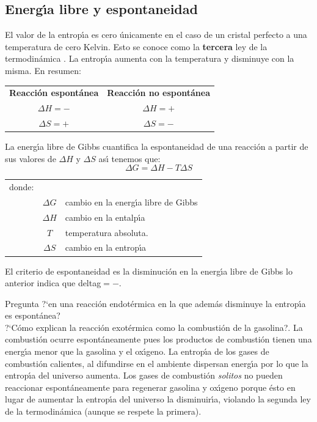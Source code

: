 \subsection{Energ\'{\i}a libre y espontaneidad}
El valor de la entrop\'{\i}a es cero \'unicamente en el caso de un cristal per\-fec\-to a una temperatura de cero Kelvin. Esto se conoce como la \textbf{tercera} ley de la termodin\'amica . La entrop\'{\i}a aumenta con la temperatura y
disminuye con la mis\-ma. En resumen:\\
\begin{center}
\begin{tabular}{cc}
\textbf{Reacci\'on espont\'anea} & \textbf{Reacci\'on no espont\'anea }\\
$\Delta H = -$ & $\Delta  H = +$\\
$\Delta S = +$ & $\Delta  S = -$ \\
\end{tabular}
\end{center}
La energ\'{\i}a libre de Gibbs cuantifica la espontaneidad de una reacci\'on a partir de sus
valores de $\Delta H$ y $\Delta S$ as\'{\i} tenemos que:
\begin{equation}
\Delta G = \Delta H - T\Delta S
\label{eq:6}
\end{equation}
\begin{tabular}{lcl}
donde:&\\
&$\Delta G$& cambio en la energ\'{\i}a libre de Gibbs \\
&$\Delta H$ &cambio en la entalp\'{\i}a\\
&$T$ &temperatura absoluta.\\
&$\Delta S$ &cambio en la entrop\'{\i}a\\
\end{tabular}

El criterio de espontaneidad es la disminuci\'on en la energ\'{\i}a libre de Gibbs lo anterior indica que 
\gls{deltag}$ = -$.

Pregunta ?`en una reacci\'on endot\'ermica en la que adem\'as disminuye la entrop\'{\i}a es
espont\'anea?\\ 
?`C\'omo explican la reacci\'on exot\'ermica como la combusti\'on de la gasolina?.
La combusti\'on ocurre  espont\'aneamente pues los productos de combusti\'on tienen una energ\'{\i}a menor que la gasolina y el ox\'{\i}geno. La entrop\'{\i}a de los gases de combusti\'on calientes, al difundirse en el ambiente dispersan e\-nerg\'{\i}a por lo que la entrop\'{\i}a del universo aumenta. Los gases de com\-busti\'on \textit{solitos} no pueden reaccionar espont\'aneamente para regenerar gasolina y ox\'{\i}geno porque \'esto en lugar de aumentar la entrop\'{\i}a del universo la disminuir\'{\i}a, violando la segunda ley de la termodin\'amica (aunque se respete la primera).

